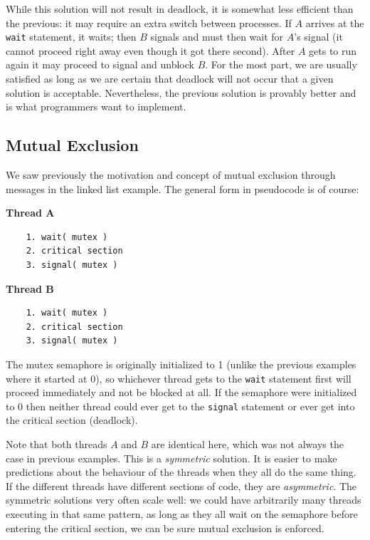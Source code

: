 While this solution will not result in deadlock, it is somewhat less efficient than the previous: it may require an extra switch between processes. If $A$ arrives at the \texttt{wait} statement, it waits; then $B$ signals and must then wait for $A$'s signal (it cannot proceed right away even though it got there second). After $A$ gets to run again it may proceed to signal and unblock $B$. For the most part, we are usually satisfied as long as we are certain that deadlock will not occur that a given solution is acceptable. Nevertheless, the previous solution is provably better and is what programmers want to implement.

\subsection*{Mutual Exclusion}
We saw previously the motivation and concept of mutual exclusion through messages in the linked list example. The general form in pseudocode is of course:

\begin{multicols}{2}
\textbf{Thread A}\vspace{-2em}
  \begin{verbatim}
	1. wait( mutex )
	2. critical section
	3. signal( mutex )
  \end{verbatim}
\columnbreak
\textbf{Thread B}\vspace{-2em}
  \begin{verbatim}
	1. wait( mutex )
	2. critical section
	3. signal( mutex )
  \end{verbatim}
\end{multicols}
\vspace{-2em}

The mutex semaphore is originally initialized to 1 (unlike the previous examples where it started at 0), so whichever thread gets to the \texttt{wait} statement first will proceed immediately and not be blocked at all. If the semaphore were initialized to 0 then neither thread could ever get to the \texttt{signal} statement or ever get into the critical section (deadlock).

Note that both threads $A$ and $B$ are identical here, which was not always the case in previous examples. This is a \textit{symmetric} solution. It is easier to make predictions about the behaviour of the threads when they all do the same thing. If the different threads have different sections of code, they are \textit{asymmetric}. The symmetric solutions very often scale well: we could have arbitrarily many threads executing in that same pattern, as long as they all wait on the semaphore before entering the critical section, we can be sure mutual exclusion is enforced.

